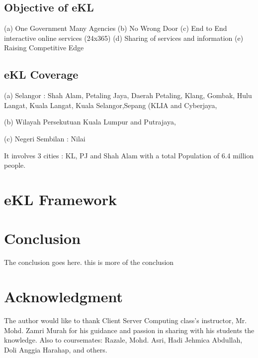 \documentclass[conference, compsoc]{IEEEtran}
\begin{document}
\subsection{Objective of eKL}
(a) One Government Many Agencies
(b) No Wrong Door
(c) End to End interactive online services (24x365) 
(d) Sharing of services and information
(e) Raising Competitive Edge

\subsection{eKL Coverage}
(a) Selangor : Shah Alam, Petaling Jaya, Daerah Petaling, Klang, Gombak, Hulu Langat, Kuala Langat, Kuala Selangor,Sepang (KLIA and Cyberjaya,  

(b) Wilayah Persekutuan Kuala Lumpur and Putrajaya,

(c) Negeri Sembilan : Nilai

It involves 3 cities : KL, PJ and Shah Alam with a total Population of 6.4 million people. 


\section{eKL Framework}


\section{Conclusion}
The conclusion goes here. this is more of the conclusion



\section*{Acknowledgment}


The author would like to thank Client Server Computing class's instructor, Mr. Mohd. Zamri Murah for his guidance and passion in sharing with his students the knowledge. Also to coursemates: Razale, Mohd. Asri, Hadi Jehmica Abdullah, Doli Anggia Harahap, and others. 


\end{document}
